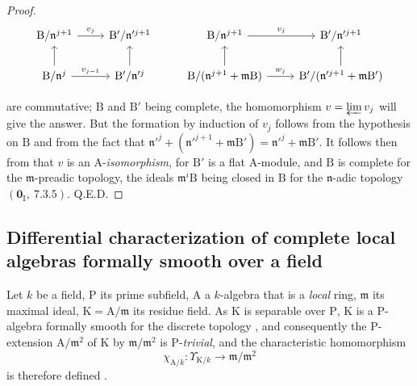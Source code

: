 \begin{proof}
\[
  \begin{tikzcd}
    \mathrm{B}/\mathfrak{n}^{j+1} \ar[r,"v_j"] & \mathrm{B}'/\mathfrak{n}'^{j+1} & \mathrm{B}/\mathfrak{n}^{j+1} \ar[r,"v_j"] & \mathrm{B}'/\mathfrak{n}'^{j+1}\\
    \mathrm{B}/\mathfrak{n}^j \ar[u] \ar[r,"v_{j-1}"] & \mathrm{B}'/\mathfrak{n}'^j \ar[u] & \mathrm{B}/(\mathfrak{n}^{j+1}+\mathfrak{m}\mathrm{B}) \ar[u] \ar[r,"w_j"] & \mathrm{B}'/(\mathfrak{n}'^{j+1}+\mathfrak{m}\mathrm{B}') \ar[u]
  \end{tikzcd}
\]

are commutative; $\mathrm{B}$ and $\mathrm{B}'$ being complete, the homomorphism $v=\varprojlim v_j$ will give the answer.
But the formation by induction of $v_j$ follows from the hypothesis on $\mathrm{B}$ and from the fact that $\mathfrak{n}'^j+(\mathfrak{n}'^{j+1}+\mathfrak{m}\mathrm{B}')=\mathfrak{n}'^j+\mathfrak{m}\mathrm{B}'$.
It follows then from  that $v$ is an $\mathrm{A}$-\emph{isomorphism}, for $\mathrm{B}'$ is a flat $\mathrm{A}$-module, and $\mathrm{B}$ is complete for the $\mathfrak{m}$-preadic topology, the ideals $\mathfrak{m}^i\mathrm{B}$ being closed in $\mathrm{B}$ for the $\mathfrak{n}$-adic topology $(\mathbf{0}_\mathrm{I},~7.3.5)$.
\hfill Q.E.D.
\end{proof}

\subsection{Differential characterization of complete local algebras formally smooth over a field}
\label{subsection:0.22.2}

\begin{env}[22.2.1]
\label{0.22.2.1}
Let $k$ be a field, $\mathrm{P}$ its prime subfield, $\mathrm{A}$ a $k$-algebra that is a \emph{local} ring, $\mathfrak{m}$ its maximal ideal, $\mathrm{K}=\mathrm{A}/\mathfrak{m}$ its residue field.
As $\mathrm{K}$ is separable over $\mathrm{P}$, $\mathrm{K}$ is a $\mathrm{P}$-algebra formally smooth for the discrete topology , and consequently the $\mathrm{P}$-extension $\mathrm{A}/\mathfrak{m}^2$ of $\mathrm{K}$ by $\mathfrak{m}/\mathfrak{m}^2$ is $\mathrm{P}$-\emph{trivial}, and the characteristic homomorphism
\[
\label{0.22.2.1.1}
  \chi_{\mathrm{A}/k}:\Upsilon_{\mathrm{K}/k}\to\mathfrak{m}/\mathfrak{m}^2
  \tag{22.2.1.1}
\]
is therefore defined .
\end{env}

